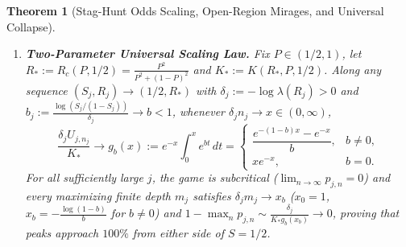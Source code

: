 \documentclass[11pt,reqno]{amsart}
\newtheorem{theorem}{Theorem}[section]
\theoremstyle{definition}
\theoremstyle{remark}
\begin{document}
\begin{theorem}[Stag-Hunt Odds Scaling, Open-Region Mirages, and Universal Collapse]
\begin{enumerate}
  \item \textbf{Two-Parameter Universal Scaling Law.} Fix $P \in (1/2, 1)$, let $R_* := R_c(P,1/2) = \frac{P^2}{P^2+(1-P)^2}$ and $K_* := K(R_*,P,1/2)$. Along any sequence $(S_j, R_j) \to (1/2, R_*)$ with $\delta_j := -\log\lambda(R_j) > 0$ and $b_j := \frac{\log(S_j/(1-S_j))}{\delta_j} \to b < 1$, whenever $\delta_j n_j \to x \in (0,\infty)$,
  \begin{equation}\label{eq:gb-law}
    \frac{\delta_j U_{j,n_j}}{K_*} \longrightarrow g_b(x) := e^{-x}\int_0^x e^{bt}\,dt =
    \begin{cases}
      \dfrac{e^{-(1-b)x} - e^{-x}}{b}, & b \neq 0,\\[6pt]
      x e^{-x}, & b = 0.
    \end{cases}
  \end{equation}
  For all sufficiently large $j$, the game is subcritical ($\lim_{n\to\infty} p_{j,n} = 0$) and every maximizing finite depth $m_j$ satisfies $\delta_j m_j \to x_b$ ($x_0 = 1$, $x_b = -\frac{\log(1-b)}{b}$ for $b \neq 0$) and $1 - \max_n p_{j,n} \sim \frac{\delta_j}{K_* g_b(x_b)} \to 0$, proving that peaks approach $100\%$ from \emph{either side} of $S = 1/2$.
\end{enumerate}
\end{theorem}
\end{document}
